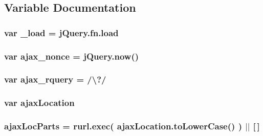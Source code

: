 \subsection{Variable Documentation}
\hypertarget{jquery-1_810_82_8js_ab9d9919a16b6ef96017991e55a3a9e6c}{
\subsubsection[{\-\_\-load}]{\setlength{\rightskip}{0pt plus 5cm}var \-\_\-load = {\bf j\-Query.\-fn.\-load}}}\label{jquery-1_810_82_8js_ab9d9919a16b6ef96017991e55a3a9e6c}
\hypertarget{jquery-1_810_82_8js_aaa43e6d4c76ee8be878dd7e93fb755a4}{
\subsubsection[{ajax\-\_\-nonce}]{\setlength{\rightskip}{0pt plus 5cm}var ajax\-\_\-nonce = {\bf j\-Query.\-now}()}}\label{jquery-1_810_82_8js_aaa43e6d4c76ee8be878dd7e93fb755a4}
\hypertarget{jquery-1_810_82_8js_a4da85c0011217bf1643139dc23999c5c}{
\subsubsection[{ajax\-\_\-rquery}]{\setlength{\rightskip}{0pt plus 5cm}var ajax\-\_\-rquery = /\textbackslash{}?/}}\label{jquery-1_810_82_8js_a4da85c0011217bf1643139dc23999c5c}
\hypertarget{jquery-1_810_82_8js_a1661d4e1676e7c6ffde5a3cb8d8ae246}{
\subsubsection[{ajax\-Location}]{\setlength{\rightskip}{0pt plus 5cm}var ajax\-Location}}\label{jquery-1_810_82_8js_a1661d4e1676e7c6ffde5a3cb8d8ae246}
\hypertarget{jquery-1_810_82_8js_a4c35110da3c335cfca38505ee65a5e79}{
\subsubsection[{ajax\-Loc\-Parts}]{\setlength{\rightskip}{0pt plus 5cm}ajax\-Loc\-Parts = rurl.\-exec( ajax\-Location.\-to\-Lower\-Case() ) $\vert$$\vert$ \mbox{[}$\,$\mbox{]}}}\label{jquery-1_810_82_8js_a4c35110da3c335cfca38505ee65a5e79}

